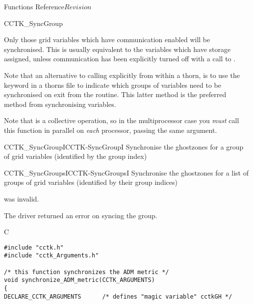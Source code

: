 \begin{cactuspart}{ Functions Reference}{}{$Revision$}
\begin{FunctionDescription}{CCTK\_SyncGroup}
\begin{Discussion}
Only those grid variables which have communication enabled
will be synchronised. This is usually equivalent to the variables
which have storage assigned, unless communication has been explicitly
turned off with a call to .

Note that an alternative to calling  explicitly
from within a thorn, is to use the  keyword in a thorns
 file to indicate which groups of variables need
to be synchronised on exit from the routine. This latter method is
the preferred method from synchronising variables.

Note that  is a collective operation, so in the
multiprocessor case you {\em must\/} call this function in parallel on
{\em each\/} processor, passing the same  argument.
\end{Discussion}

\begin{SeeAlsoSection}
\begin{SeeAlso2}{CCTK\_SyncGroupI}{CCTK-SyncGroupI}
Synchronise the ghostzones for a group of grid variables
(identified by the group index)
\end{SeeAlso2}
\begin{SeeAlso2}{CCTK\_SyncGroupsI}{CCTK-SyncGroupsI}
Synchronise the ghostzones for a list of groups of grid variables
(identified by their group indices)
\end{SeeAlso2}
\end{SeeAlsoSection}

\begin{ErrorSection}
\begin{Error}{-1}
 was invalid.
\end{Error}
\begin{Error}{-2}
The driver returned an error on syncing the group.
\end{Error}
\end{ErrorSection}

\begin{ExampleSection}
\begin{Example}{C}
\begin{verbatim}
#include "cctk.h"
#include "cctk_Arguments.h"

/* this function synchronizes the ADM metric */
void synchronize_ADM_metric(CCTK_ARGUMENTS)
{
DECLARE_CCTK_ARGUMENTS      /* defines "magic variable" cctkGH */


\end{verbatim}
\end{Example}
\end{ExampleSection}
\end{FunctionDescription}
\end{cactuspart}
